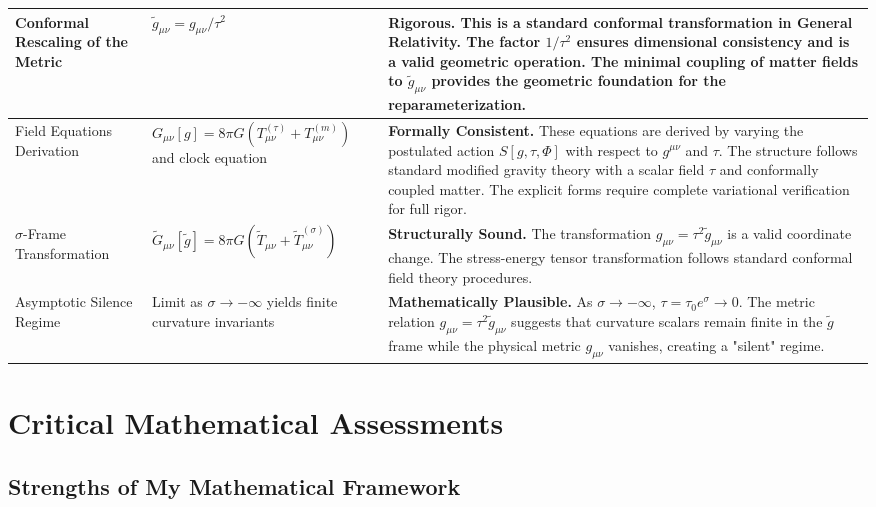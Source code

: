 \documentclass[11pt,a4paper]{article}
\begin{document}
\begin{longtable}{|p{3cm}|p{6cm}|p{6cm}|}
Conformal Rescaling of the Metric & 
$\tilde{g}_{\mu\nu} = g_{\mu\nu}/\tau^2$ & 
\textbf{Rigorous.} This is a standard conformal transformation in General Relativity. The factor $1/\tau^2$ ensures dimensional consistency and is a valid geometric operation. The minimal coupling of matter fields to $\tilde{g}_{\mu\nu}$ provides the geometric foundation for the reparameterization. \\
\hline

Field Equations Derivation & 
$G_{\mu\nu}[g] = 8\pi G(T^{(\tau)}_{\mu\nu} + T^{(m)}_{\mu\nu})$ and clock equation & 
\textbf{Formally Consistent.} These equations are derived by varying the postulated action $S[g,\tau,\Phi]$ with respect to $g^{\mu\nu}$ and $\tau$. The structure follows standard modified gravity theory with a scalar field $\tau$ and conformally coupled matter. The explicit forms require complete variational verification for full rigor. \\
\hline

$\sigma$-Frame Transformation & 
$\tilde{G}_{\mu\nu}[\tilde{g}] = 8\pi G(\tilde{T}_{\mu\nu} + \tilde{T}^{(\sigma)}_{\mu\nu})$ & 
\textbf{Structurally Sound.} The transformation $g_{\mu\nu} = \tau^2 \tilde{g}_{\mu\nu}$ is a valid coordinate change. The stress-energy tensor transformation follows standard conformal field theory procedures. \\
\hline

Asymptotic Silence Regime & 
Limit as $\sigma \to -\infty$ yields finite curvature invariants & 
\textbf{Mathematically Plausible.} As $\sigma \to -\infty$, $\tau = \tau_0 e^{\sigma} \to 0$. The metric relation $g_{\mu\nu} = \tau^2 \tilde{g}_{\mu\nu}$ suggests that curvature scalars remain finite in the $\tilde{g}$ frame while the physical metric $g_{\mu\nu}$ vanishes, creating a "silent" regime. \\
\hline

\end{longtable}

\section{Critical Mathematical Assessments}

\subsection{Strengths of My Mathematical Framework}
\end{document}
